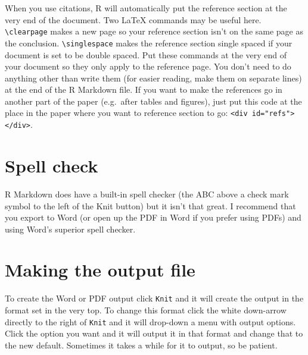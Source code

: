 \documentclass[
]{krantz}
\begin{document}
When you use citations, R will automatically put the
reference section at the very end of the document. Two LaTeX
commands may be useful here.
\texttt{\textbackslash{}clearpage} makes a new page so your
reference section isn't on the same page as the conclusion.
\texttt{\textbackslash{}singlespace} makes the reference
section single spaced if your document is set to be double
spaced. Put these commands at the very end of your document
so they only apply to the reference page. You don't need to
do anything other than write them (for easier reading, make
them on separate lines) at the end of the R Markdown file.
If you want to make the references go in another part of the
paper (e.g.~after tables and figures), just put this code at
the place in the paper where you want to reference section
to go:
\texttt{\textless{}div\ id="refs"\textgreater{}\textless{}/div\textgreater{}}.

\hypertarget{spell-check}{%
\section{Spell check}\label{spell-check}}

R Markdown does have a built-in spell checker (the ABC above
a check mark symbol to the left of the Knit button) but it
isn't that great. I recommend that you export to Word (or
open up the PDF in Word if you prefer using PDFs) and using
Word's superior spell checker.

\hypertarget{making-the-output-file}{%
\section{Making the output
file}\label{making-the-output-file}}

To create the Word or PDF output click \texttt{Knit} and it
will create the output in the format set in the very top. To
change this format click the white down-arrow directly to
the right of \texttt{Knit} and it will drop-down a menu with
output options. Click the option you want and it will output
it in that format and change that to the new default.
Sometimes it takes a while for it to output, so be patient.
\end{document}
